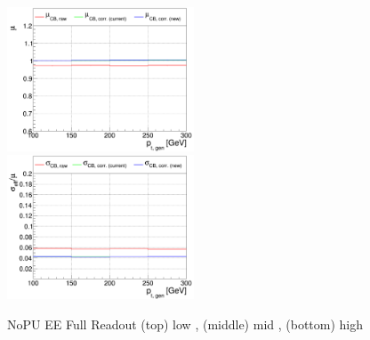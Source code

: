 \begin{figure}
\includegraphics[width=0.495\textwidth]{./plots_pdf/ECAL_plots/plotsNoPU/EE/pdf/FULL/GENPT/EEFULL_GENPT_0100_0300_MuOverBins.pdf}
\includegraphics[width=0.495\textwidth]{./plots_pdf/ECAL_plots/plotsNoPU/EE/pdf/FULL/GENPT/EEFULL_GENPT_0100_0300_EffSigmaOverBins.pdf}


\caption [Energy response of PF ECAL cluster vs \pt for NoPU EE Full readout senario]{NoPU EE Full Readout (top) low \pt, (middle) mid \pt, (bottom) high \pt}
\label{fig:NOPU_EEFULL_pt}
\end{figure}



